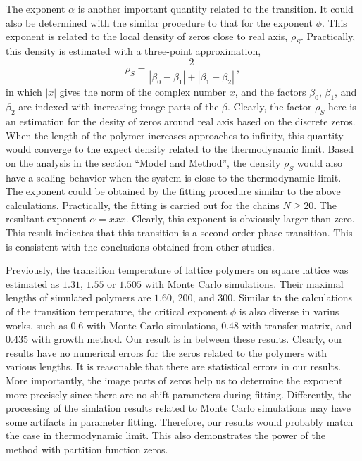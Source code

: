 \documentclass[preprint,preprintnumbers,amsmath,amssymb,showpacs,aps,pre]{revtex4-1}
\begin{document}
The exponent $\alpha$ is another important quantity related to the transition.
It could also be determined with the similar procedure to that for the
exponent $\phi$. This exponent is related to the local density of zeros close
to real axis, $\rho_S$. Practically, this density is estimated with a
three-point approximation,
\begin{equation}
\rho_S=\frac{2}{|\beta_0-\beta_1|+|\beta_1-\beta_2|} \, ,
\end{equation}
in which $|x|$ gives the norm of the complex number $x$, and the factors
$\beta_0$, $\beta_1$, and $\beta_2$ are indexed with increasing image parts of
the $\beta$. Clearly, the factor $\rho_S$ here is an estimation for the desity
of zeros around real axis based on the discrete zeros. When the length of the
polymer increases approaches to infinity, this quantity would converge to
the expect density related to the thermodynamic limit. Based on the analysis
in the section ``Model and Method'', the density $\rho_S$ would also have a
scaling behavior when the system is close to the thermodynamic limit. The
exponent could be obtained by the fitting procedure similar to the above
calculations. Practically, the fitting is carried out for the chains $N\ge
20$. The resultant exponent $\alpha=xxx$. Clearly, this exponent is obviously
larger than zero. This result indicates that this transition is a second-order
phase transition. This is consistent with the conclusions obtained from other
studies.

Previously, the transition temperature of lattice polymers on square lattice
was estimated as $1.31$\cite{JP82}, $1.55$\cite{BirshteinPolymer85} or
$1.505$\cite{OYJCP08} with Monte Carlo simulations. Their maximal lengths of
simulated polymers are $1.60$, $200$, and $300$. Similar to the calculations
of the transition temperature, the critical exponent $\phi$ is also diverse in
varius works, such as $0.6$\cite{BirshteinPolymer85} with Monte Carlo
simulations, $0.48$\cite{SaleurJSP86} with transfer matrix, and
$0.435$\cite{HeegerJP95} with growth method. Our result is in between
these results. Clearly, our results have no numerical errors for the zeros
related to the polymers with various lengths. It is reasonable that there are
statistical errors in our results. More importantly, the image parts of zeros
help us to determine the exponent more precisely since there are no shift
parameters during fitting. Differently, the processing of the simlation
results related to Monte Carlo simulations may have some artifacts in
parameter fitting. Therefore, our results would probably match the
case in thermodynamic limit. This also demonstrates the power of the method
with partition function zeros.
\end{document}
